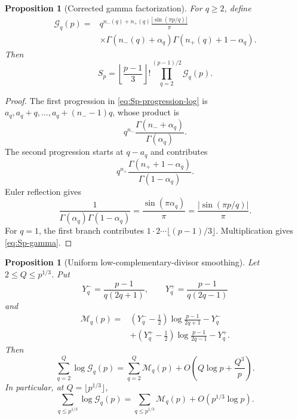 \documentclass[11pt]{amsart}
\numberwithin{equation}{section}
\newtheorem{proposition}[theorem]{Proposition}
\theoremstyle{definition}
\theoremstyle{remark}
\begin{document}
\begin{proposition}[Corrected gamma factorization]\label{prop:gamma-core}
For \(q\ge2\), define
\begin{equation}\label{eq:Gq-correct}
\begin{aligned}
 \mathcal G_q(p)
={}&q^{n_-(q)+n_+(q)}\frac{|\sin(\pi p/q)|}{\pi}\\
&\times
 \Gamma\!\left(n_-(q)+\alpha_q\right)
 \Gamma\!\left(n_+(q)+1-\alpha_q\right).
\end{aligned}
\end{equation}
Then
\begin{equation}\label{eq:Sp-gamma}
 S_p=\left\lfloor\frac{p-1}{3}\right\rfloor!
 \prod_{q=2}^{(p-1)/2}\mathcal G_q(p).
\end{equation}
\end{proposition}

\begin{proof}
The first progression in \eqref{eq:Sp-progression-log} is
\(a_q,a_q+q,\ldots,a_q+(n_--1)q\), whose product is
\[
 q^{n_-}\frac{\Gamma(n_-+\alpha_q)}{\Gamma(\alpha_q)}.
\]
The second progression starts at \(q-a_q\) and contributes
\[
 q^{n_+}\frac{\Gamma(n_++1-\alpha_q)}{\Gamma(1-\alpha_q)}.
\]
Euler reflection gives
\[
 \frac1{\Gamma(\alpha_q)\Gamma(1-\alpha_q)}
 =\frac{\sin(\pi\alpha_q)}{\pi}
 =\frac{|\sin(\pi p/q)|}{\pi}.
\]
For \(q=1\), the first branch contributes
\(1\cdot2\cdots\lfloor(p-1)/3\rfloor\).  Multiplication gives
\eqref{eq:Sp-gamma}.
\end{proof}

\begin{proposition}[Uniform low-complementary-divisor smoothing]\label{prop:low-q-stirling}
Let \(2\le Q\le p^{1/3}\).  Put
\[
 Y_q^- =\frac{p-1}{q(2q+1)},\qquad
 Y_q^+ =\frac{p-1}{q(2q-1)}
\]
and
\begin{equation}\label{eq:Mq-smooth}
\begin{aligned}
 \mathcal M_q(p)
={}&\left(Y_q^--\frac12\right)
 \log\frac{p-1}{2q+1}-Y_q^-\\
&+\left(Y_q^+-\frac12\right)
 \log\frac{p-1}{2q-1}-Y_q^+.
\end{aligned}
\end{equation}
Then
\begin{equation}\label{eq:low-q-stirling}
 \sum_{q=2}^{Q}\log\mathcal G_q(p)
 =\sum_{q=2}^{Q}\mathcal M_q(p)
 +O\!\left(Q\log p+\frac{Q^3}{p}\right).
\end{equation}
In particular, at \(Q=\lfloor p^{1/3}\rfloor\),
\begin{equation}\label{eq:low-q-third}
 \sum_{q\le p^{1/3}}\log\mathcal G_q(p)
 =\sum_{q\le p^{1/3}}\mathcal M_q(p)+O(p^{1/3}\log p).
\end{equation}
\end{proposition}
\end{document}
